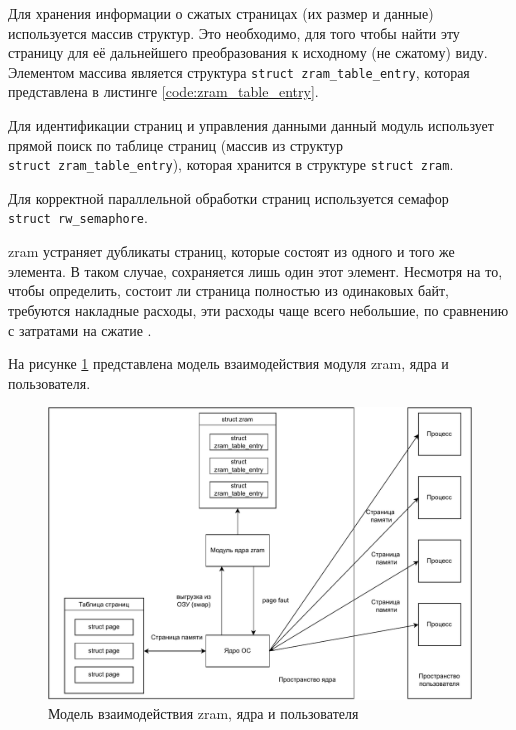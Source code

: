 Для хранения информации о сжатых страницах (их размер и данные) используется массив структур. Это необходимо, для того чтобы найти эту страницу для её дальнейшего преобразования к исходному (не сжатому) виду. Элементом массива является структура \texttt{struct zram\_table\_entry}, которая представлена в листинге \ref{code:zram_table_entry}.


Для идентификации страниц и управления данными данный модуль использует прямой поиск по таблице страниц (массив из структур \\\texttt{struct zram\_table\_entry}), которая хранится в структуре \texttt{struct zram}.

Для корректной параллельной обработки страниц используется семафор \\\texttt{struct rw\_semaphore}.

zram устраняет дубликаты страниц, которые состоят из одного и того же элемента. В таком случае, сохраняется лишь один этот элемент. Несмотря на то, чтобы определить, состоит ли страница полностью из одинаковых байт, требуются накладные расходы, эти расходы чаще всего небольшие, по сравнению с затратами на сжатие \cite{in-kernel-memory-compression}.

На рисунке \ref{fig:zram-kernel} представлена модель взаимодействия модуля zram, ядра и пользователя.

\begin{figure}[h]
	\centering
	\includegraphics[width=\textwidth]{img/zram-kernel.pdf}
	\caption{Модель взаимодействия zram, ядра и пользователя}
	\label{fig:zram-kernel}
\end{figure}

